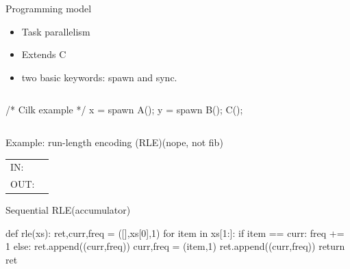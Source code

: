 \documentclass[13pt]{beamer}
\begin{document}
\begin{frame}[fragile]{Programming model}{}
\begin{itemize}
    \item Task parallelism
    \item Extends C
    \item two basic keywords: {\ttfamily spawn} and {\ttfamily sync}.
\end{itemize}

\begin{columns}
\begin{semiverbatim}
/* Cilk example */
x = \alert{spawn} A();
y = \alert{spawn} B();
C();
\end{semiverbatim}
\begin{center}
\end{center}
\end{columns}
\end{frame}

\begin{frame}[fragile]{Example: run-length encoding (RLE)}{(nope, not fib)}
{
\centering
\Large
\begin{tabular}{ll}
IN:  & {\ttfamily [a,a,a,a,b,b,b,c,c,c,c,c]} \\
OUT: & {\ttfamily [(a,4),(b,3),(c,5)]} \\
\end{tabular}
}
\end{frame}

\begin{frame}[fragile]{Sequential RLE}{(accumulator)}
\begin{semiverbatim}
def rle(xs):
    ret,curr,freq = ([],xs[0],1)
    for item in xs[1:]:
        if item == curr:
            freq += 1
        else:
            ret.append((curr,freq))
            curr,freq = (item,1)
        ret.append((curr,freq))
    return ret
\end{semiverbatim}
\end{frame}
\end{document}

